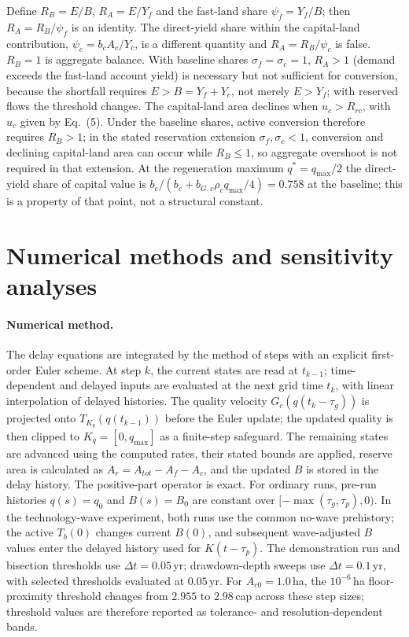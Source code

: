 \documentclass[11pt,a4paper]{article}
\begin{document}
Define $R_B=E/B$, $R_A=E/Y_f$ and the fast-land share $\psi_f=Y_f/B$; then $R_A=R_B/\psi_f$ is an identity. The direct-yield share within the capital-land contribution, $\psi_c=b_cA_c/Y_c$, is a different quantity and $R_A=R_B/\psi_c$ is false. $R_B=1$ is aggregate balance. With baseline shares $\sigma_f=\sigma_c=1$, $R_A>1$ (demand exceeds the fast-land account yield) is necessary but not sufficient for conversion, because the shortfall requires $E>B=Y_f+Y_c$, not merely $E>Y_f$; with reserved flows the threshold changes. The capital-land area declines when $u_c>R_{rc}$, with $u_c$ given by Eq.~(5). Under the baseline shares, active conversion therefore requires $R_B>1$; in the stated reservation extension $\sigma_f,\sigma_c<1$, conversion and declining capital-land area can occur while $R_B\le1$, so aggregate overshoot is not required in that extension. At the regeneration maximum $q^*=q_{\max}/2$ the direct-yield share of capital value is $b_c/(b_c+b_{G,c}\rho_cq_{\max}/4)=0.758$ at the baseline; this is a property of that point, not a structural constant.
\section{Numerical methods and sensitivity analyses}\label{si:numerics}

\paragraph{Numerical method.} The delay equations are integrated by the method of steps with an explicit first-order Euler scheme. At step $k$, the current states are read at $t_{k-1}$; time-dependent and delayed inputs are evaluated at the next grid time $t_k$, with linear interpolation of delayed histories. The quality velocity $G_c(q(t_k-\tau_g))$ is projected onto $T_{K_q}(q(t_{k-1}))$ before the Euler update; the updated quality is then clipped to $K_q=[0,q_{\max}]$ as a finite-step safeguard. The remaining states are advanced using the computed rates, their stated bounds are applied, reserve area is calculated as $A_r=A_{tot}-A_f-A_c$, and the updated $B$ is stored in the delay history. The positive-part operator is exact. For ordinary runs, pre-run histories $q(s)=q_0$ and $B(s)=B_0$ are constant over $[-\max(\tau_g,\tau_p),0)$. In the technology-wave experiment, both runs use the common no-wave prehistory; the active $T_b(0)$ changes current $B(0)$, and subsequent wave-adjusted $B$ values enter the delayed history used for $K(t-\tau_p)$. The demonstration run and bisection thresholds use $\Delta t=0.05$\,yr; drawdown-depth sweeps use $\Delta t=0.1$\,yr, with selected thresholds evaluated at $0.05$\,yr. For $A_{c0}=1.0$\,ha, the $10^{-6}$\,ha floor-proximity threshold changes from $2.955$ to $2.98$\,cap across these step sizes; threshold values are therefore reported as tolerance- and resolution-dependent bands.
\end{document}
